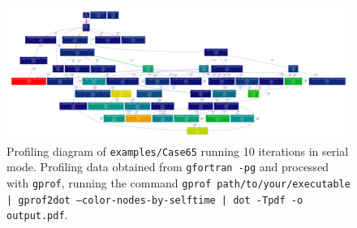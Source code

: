 \newpage

\begin{figure}[!h]
  \centering
  \includegraphics[clip,width=0.9\textheight,angle=90]{fig-profiling65.pdf}
  \caption{Profiling diagram of \texttt{examples/Case65} running 10 iterations in serial mode. Profiling data obtained from \texttt{gfortran -pg} and processed with \texttt{gprof}, running the command \texttt{gprof path/to/your/executable | gprof2dot --color-nodes-by-selftime | dot -Tpdf -o output.pdf}.}
\end{figure}

